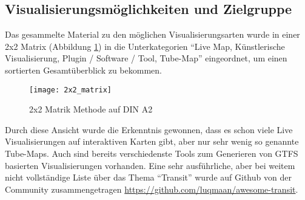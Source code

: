 \subsection{Visualisierungsmöglichkeiten und Zielgruppe}
\label{sub:visualisierungsmöglichkeiten_und_zielgruppe}

  Das gesammelte Material zu den möglichen Visualisierungsarten wurde in einer 2x2 Matrix (Abbildung \ref{fig:2x2_matrix}) in die Unterkategorien "`Live Map, Künstlerische Visualisierung, Plugin / Software / Tool, Tube-Map"' eingeordnet, um einen sortierten Gesamtüberblick zu bekommen. 

  \begin{figure}[htbp]
    \begin{center}
      \texttt{[image: 2x2\_matrix]}
      \caption{2x2 Matrik Methode auf DIN A2}
      \label{fig:2x2_matrix}
    \end{center}
  \end{figure}

  Durch diese Ansicht wurde die Erkenntnis gewonnen, dass es schon viele Live Visualisierungen auf interaktiven Karten gibt, aber nur sehr wenig so genannte Tube-Maps. Auch sind bereits verschiedenste Tools zum Generieren von GTFS basierten Visualisierungen vorhanden. Eine sehr ausführliche, aber bei weitem nicht vollständige Liste über das Thema "`Transit"' wurde auf Github von der Community zusammengetragen \url{https://github.com/luqmaan/awesome-transit}.


